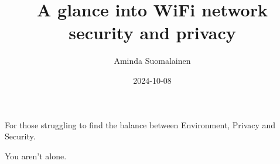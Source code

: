 \documentclass[a4paper]{rapport3}
\title{A glance into WiFi network security and privacy}
\author{Aminda Suomalainen}
\date{2024-10-08}
\newenvironment{dedication}
	{
		\thispagestyle{empty}%
		\vspace*{\stretch{1}}%
		\itshape             %
		\raggedleft          %
	}
	{\par %
	\vspace{\stretch{3}} %
	\clearpage           %
	}
\begin{document}
\maketitle

\begin{dedication}
For those struggling to find the balance between Environment, Privacy and Security. \par You aren't alone.
\end{dedication}

\tableofcontents
\newpage

%
%
%


%
%
%
%
%




%
\end{document}
